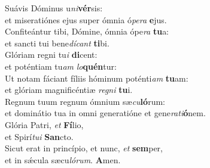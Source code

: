 \evenverse Suávis Dóminus u\textit{ni}\textbf{vér}sis:~\*\\
\evenverse et miseratiónes ejus super ómnia ó\textit{pe}\textit{ra} \textbf{e}jus.\\
\oddverse Confiteántur tibi, Dómine, ómnia ópe\textit{ra} \textbf{tu}a:~\*\\
\oddverse et sancti tui bene\textit{dí}\textit{cant} \textbf{ti}bi.\\
\evenverse Glóriam regni tu\textit{i} \textbf{di}cent:~\*\\
\evenverse et poténtiam tu\textit{am} \textit{lo}\textbf{quén}tur:\\
\oddverse Ut notam fáciant fíliis hóminum poténti\textit{am} \textbf{tu}am:~\*\\
\oddverse et glóriam magnificéntiæ \textit{re}\textit{gni} \textbf{tu}i.\\
\evenverse Regnum tuum regnum ómnium sæ\textit{cu}\textbf{ló}rum:~\*\\
\evenverse et dominátio tua in omni generatióne et gene\textit{ra}\textit{ti}\textbf{ó}nem.\\
\oddverse Glória Patri, \textit{et} \textbf{Fí}lio,~\*\\
\oddverse et Spirí\textit{tu}\textit{i} \textbf{San}cto.\\
\evenverse Sicut erat in princípio, et nunc, \textit{et} \textbf{sem}per,~\*\\
\evenverse et in sǽcula sæcu\textit{ló}\textit{rum}. \textbf{A}men.\\
